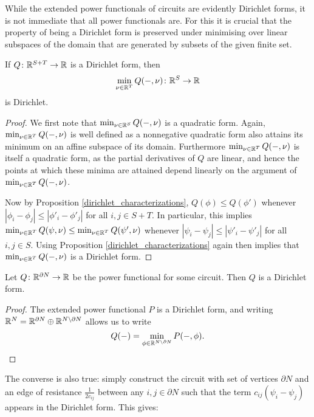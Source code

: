 While the extended power functionals of circuits are evidently Dirichlet forms,
it is not immediate that all power functionals are. For this it is crucial that
the property of being a Dirichlet form is preserved under minimising over linear
subspaces of the domain that are generated by subsets of the given finite set.

\begin{proposition} \label{dirichlet_minimization}
  If $Q{\colon} {\mathbb{R}}^{S+T} \to {\mathbb{R}}$ is a Dirichlet form, then 
  \[
    \min_{\nu \in {\mathbb{R}}^T} Q(-,\nu){\colon} {\mathbb{R}}^S \to {\mathbb{R}} 
  \]
  is Dirichlet.
\end{proposition}
\begin{proof}
  We first note that $\min_{\nu \in {\mathbb{R}}^S} Q(-,\nu)$ is a quadratic form. Again,
  $\min_{\nu \in {\mathbb{R}}^T} Q(-,\nu)$ is well defined as a nonnegative quadratic form
  also attains its minimum on an affine subspace of its domain. Furthermore
  $\min_{\nu \in {\mathbb{R}}^T} Q(-,\nu)$ is itself a quadratic form, as the partial
  derivatives of $Q$ are linear, and hence the points at which these minima are
  attained depend linearly on the argument of $\min_{\nu \in {\mathbb{R}}^T} Q(-,\nu)$.

  Now by Proposition \ref{dirichlet_characterizations}, $Q(\phi) \le Q(\phi')$
  whenever $|\phi_i - \phi_j| \le |\phi'_i - \phi'_j|$ for all $i,j \in S+T$. In
  particular, this implies $\min_{\nu \in {\mathbb{R}}^T} Q(\psi,\nu) \le \min_{\nu \in
  {\mathbb{R}}^T} Q(\psi',\nu)$ whenever $|\psi_i - \psi_j| \le |\psi'_i - \psi'_j|$ for
  all $i,j \in S$. Using Proposition \ref{dirichlet_characterizations} again
  then implies that $\min_{\nu \in {\mathbb{R}}^T} Q(-,\nu)$ is a Dirichlet form.
\end{proof}


\begin{corollary}
  Let $Q {\colon} {\mathbb{R}}^{\partial N} \to {\mathbb{R}}$ be the power functional for some circuit. Then
  $Q$ is a Dirichlet form.
\end{corollary}
\begin{proof}
  The extended power functional $P$ is a Dirichlet form, and writing ${\mathbb{R}}^N=
  {\mathbb{R}}^{\partial N} \oplus {\mathbb{R}}^{N \setminus \partial N}$ allows us to write
  \[
    Q(-) =  \min_{\phi\in {\mathbb{R}}^{N \setminus \partial N}}
    P(-,\phi). \qedhere
  \]
\end{proof}

The converse is also true: simply construct the circuit with set of vertices
$\partial N$ and an edge of resistance $\frac{1}{2c_{ij}}$ between any $i,j \in
\partial N$ such that the term $c_{ij}(\psi_i - \psi_j)$ appears in the
Dirichlet form. This gives: 

